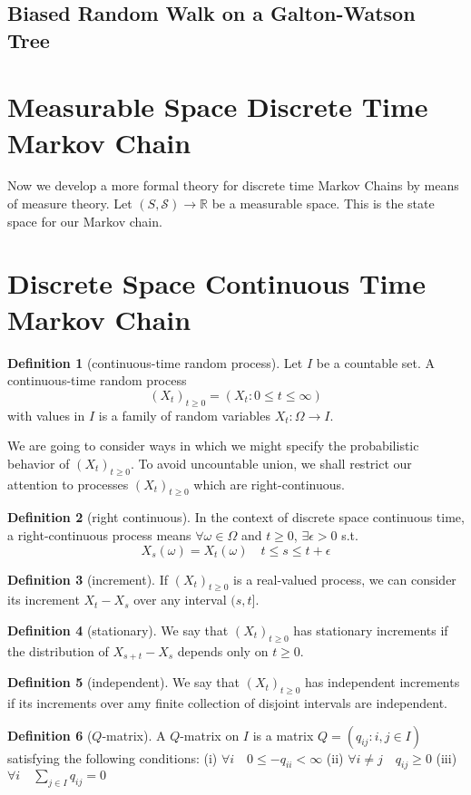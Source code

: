 \documentclass{article}
\theoremstyle{definition}
\newtheorem{Def}{Definition}[section]
\begin{document}
\subsection{Biased Random Walk on a Galton-Watson Tree}



\section{Measurable Space Discrete Time Markov Chain}
Now we develop a more formal theory for discrete time Markov Chains by means of measure theory.
Let $(S,\mathcal{S})\to\mathbb{R}$ be a measurable space. This is the state space for our Markov chain.


\section{Discrete Space Continuous Time Markov Chain}

\begin{Def}[continuous-time random process]
    Let $I$ be a countable set. A continuous-time random process \[(X_t)_{t\ge 0}=(X_t:0\le t\le\infty)\] 
    with values in $I$ is a family of random variables $X_t:\Omega\to I$.
\end{Def}
We are going to consider ways in which we might specify the probabilistic behavior of $(X_t)_{t\ge 0}$.
To avoid uncountable union, we shall restrict our attention to processes $(X_t)_{t\ge 0}$ which are right-continuous.
\begin{Def}[right continuous]
    In the context of discrete space continuous time, a right-continuous process means $\forall \omega\in\Omega$
    and $t\ge 0$, $\exists \epsilon>0$ s.t. \[X_s(\omega)=X_t(\omega)\quad t\le s\le t+\epsilon\]
\end{Def}
\begin{Def}[increment]
    If $(X_t)_{t\ge 0}$ is a real-valued process, we can consider its increment $X_t-X_s$ over any interval $(s,t]$.
\end{Def}
\begin{Def}[stationary]
    We say that $(X_t)_{t\ge 0}$ has stationary increments if the distribution of $X_{s+t}-X_s$ depends only on $t\ge 0$.
\end{Def}
\begin{Def}[independent]
    We say that $(X_t)_{t\ge 0}$ has independent increments if its increments over amy finite collection of disjoint intervals are independent.
\end{Def}
\begin{Def}[$Q$-matrix]
    A $Q$-matrix on $I$ is a matrix $Q=(q_{ij}:i,j\in I)$ satisfying the following conditions:\newline
(i) $\forall i\quad 0\le -q_{ii}<\infty$ \newline 
(ii) $\forall i\ne j\quad q_{ij}\ge 0$\newline 
(iii) $\forall i\quad \sum_{j\in I}q_{ij}=0$
\end{Def}
\end{document}
